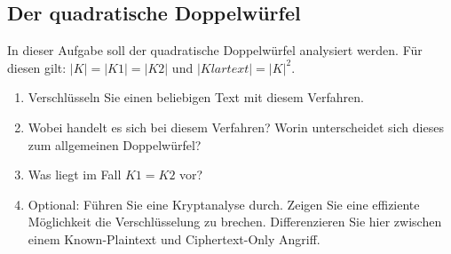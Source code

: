  \subsection{Der quadratische Doppelwürfel}
 In dieser Aufgabe soll der quadratische Doppelwürfel analysiert werden. Für diesen gilt: $|K|=|K1|=|K2|$ und $|Klartext|=|K|^2$.
 \begin{enumerate}
    \item Verschlüsseln Sie einen beliebigen Text mit diesem Verfahren.
    \item Wobei handelt es sich bei diesem Verfahren? Worin unterscheidet sich dieses zum allgemeinen Doppelwürfel?
    \item Was liegt im Fall $K1 = K2$ vor?
    \item Optional: Führen Sie eine Kryptanalyse durch. Zeigen Sie eine effiziente Möglichkeit die Verschlüsselung zu brechen. Differenzieren Sie hier zwischen einem Known-Plaintext und Ciphertext-Only Angriff.
 \end{enumerate}

